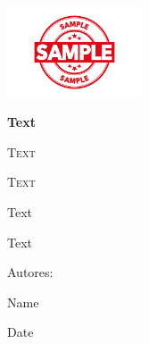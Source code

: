 \begin{titlepage}
    \centering
    \includegraphics[width=0.3\textwidth]{./images/Example.png}\par
    \vspace{1cm}
    {\bfseries\LARGE Text\par}
    \vspace{0.5cm}
    {\scshape\Large Text\par}
    \vspace{2cm}
    {\scshape\Huge Text\par}
    \vspace{2cm}
    {\Huge Text\par}
    {\Large Text\par}
    \vfill
    {\Large Autores: \par}
    {\Large Name\par}
    \vfill
    {\Large Date\par}
\end{titlepage}
